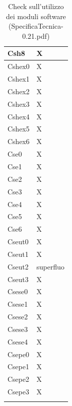 \begin{footnotesize}
\begin{longtable}{|p{}|p{}|}
 Csh8 &X  \\ \hline
 Cshex0 &X  \\ \hline
 Cshex1 &X  \\ \hline
 Cshex2 &X  \\ \hline
 Cshex3 &X  \\ \hline
 Cshex4 &X  \\ \hline
 Cshex5 &X  \\ \hline
 Cshex6 &X  \\ \hline
 Cse0 &X  \\ \hline
 Cse1 &X  \\ \hline
 Cse2 &X  \\ \hline
 Cse3 &X  \\ \hline
 Cse4 &X  \\ \hline
 Cse5 &X  \\ \hline
 Cse6 &X  \\ \hline
 Cseut0 &X  \\ \hline
 Cseut1 &X  \\ \hline
 Cseut2 &superfluo  \\ \hline
 Cseut3 &X  \\ \hline
 Csese0 &X  \\ \hline
 Csese1 &X  \\ \hline
 Csese2 &X  \\ \hline
 Csese3 &X  \\ \hline
 Csese4 &X  \\ \hline
 Csepe0 &X  \\ \hline
 Csepe1 &X  \\ \hline
 Csepe2 &X  \\ \hline
 Csepe3 &X  \\ \hline

\caption{Check sull'utilizzo dei moduli software (SpecificaTecnica-0.21.pdf)}
\end{longtable}
\end{footnotesize}

